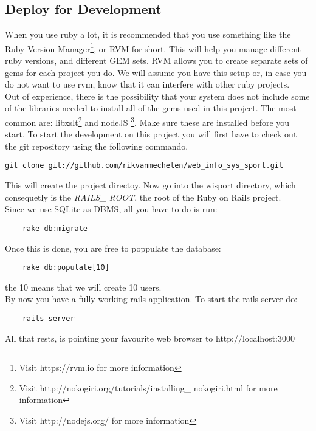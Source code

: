 \subsection{Deploy for Development}
When you use ruby a lot, it is recommended that you use something like the Ruby Version Manager\footnote{Visit https://rvm.io for more information}, or RVM for short. This will help you manage different ruby versions, and different GEM sets. RVM allows you to create separate sets of gems for each project you do. We will assume you have this setup or, in case you do not want to use rvm, know that it can interfere with other ruby projects.\\
Out of experience, there is the possibility that your system does not include some of the libraries needed to install all of the gems used in this project. The most common are: libxslt\footnote{Visit http://nokogiri.org/tutorials/installing\_ nokogiri.html for more information} and nodeJS \footnote{Visit http://nodejs.org/ for more information}. Make sure these are installed before you start.
To start the development on this project you will first have to check out the git repository using the following commando.
\begin{lstlisting}
git clone git://github.com/rikvanmechelen/web_info_sys_sport.git
\end{lstlisting}
This will create the project directoy. Now go into the wisport directory, which consequetly is the \textit{RAILS\_ ROOT}, the root of the Ruby on Rails project.\\
Since we use SQLite as DBMS, all you have to do is run:
\begin{lstlisting}
	rake db:migrate
\end{lstlisting}
Once this is done, you are free to poppulate the database: 
\begin{lstlisting}
	rake db:populate[10]
\end{lstlisting}
the 10 means that we will create 10 users.\\
By now you have a fully working rails application.
To start the rails server do:
\begin{lstlisting}
	rails server
\end{lstlisting}
All that rests, is pointing your favourite web browser to http://localhost:3000

